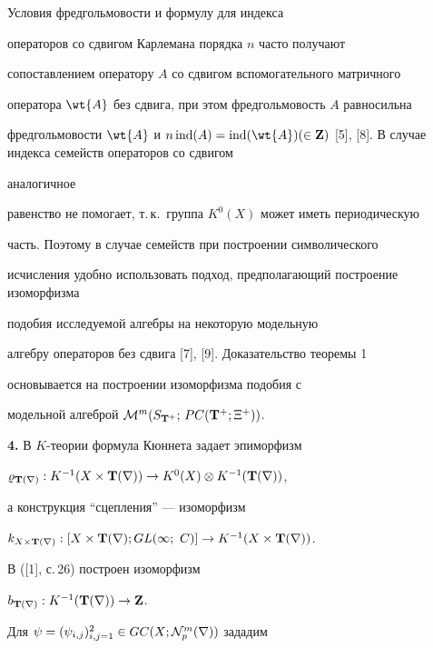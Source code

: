 \begin{notenonum}


Условия фредгольмовости и формулу для индекса


операторов со сдвигом Карлемана порядка $n$ часто получают


сопоставлением оператору $A$ со сдвигом вспомогательного матричного


оператора $\wt{A}$ без сдвига, при этом фредгольмовость $A$ равносильна


фредгольмовости $\wt{A}$ и $n \ind(A)=\ind(\wt{A}) (\in


{\bold Z})$ [5], [8]. В случае индекса семейств операторов со сдвигом


аналогичное


равенство не помогает, т.\,к.\ группа $K^0(X)$ может иметь периодическую


часть. Поэтому в случае семейств при построении символического


исчисления удобно использовать подход, предполагающий построение изоморфизма


подобия исследуемой алгебры на некоторую модельную


алгебру операторов без сдвига [7], [9]. Доказательство теоремы 1


основывается на построении изоморфизма подобия с


модельной алгеброй ${\cal M}^m(S_{{\bold T}^+};\,PC({\bold T}^+;\Xi^+))$.


\end{notenonum}





{\bf 4.} В $K$-теории формула Кюннета задает эпиморфизм


$\varrho_{{\bold T} (\nabla)}:K^{-1}(X\times {\bold T} (\nabla))\to K^0(X)


\otimes K^{-1}({\bold T} (\nabla))$,


а конструкция ``сцепления'' --- изоморфизм


$k_{X\times {\bold T} (\nabla)}:


[X\times {\bold T} (\nabla); GL(\infty;{\bold\ C})]\to K^{-1}


(X\times {\bold T} (\nabla))$.


В ([1], с.\,26) построен изоморфизм


$b_{{\bold T} (\nabla)} :K^{-1}({\bold T} (\nabla))\to {\bold Z}$.


Для $\psi =(\psi_{i,j})_{i,j=1}^2\in GC(X;{\cal


N}_p^m(\nabla))$ зададим


